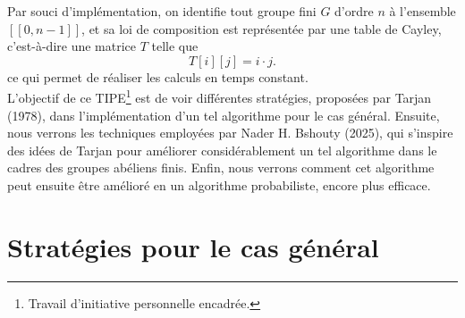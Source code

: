 \documentclass[12pt]{article}
\begin{document}
\begin{center}
\end{center}
Par souci d’implémentation, on identifie tout groupe fini $G$ d’ordre $n$ à l’ensemble $[\![0, n-1]\!]$, et sa loi de composition est représentée par une table de Cayley, c’est-à-dire une matrice $T$ telle que
\[
T[i][j] = i \cdot j.
\]
ce qui permet de réaliser les calculs en temps constant. \\

L'objectif de ce TIPE\footnote{Travail d’initiative personnelle encadrée.} est de voir différentes stratégies, proposées par Tarjan (1978), dans l'implémentation d'un tel algorithme pour le cas général. Ensuite, nous verrons les techniques employées par Nader H. Bshouty (2025), qui s'inspire des idées de Tarjan pour améliorer considérablement un tel algorithme dans le cadres des groupes abéliens finis. Enfin, nous verrons comment cet algorithme peut ensuite être amélioré en un algorithme probabiliste, encore plus efficace.


\section{Stratégies pour le cas général}
\end{document}
